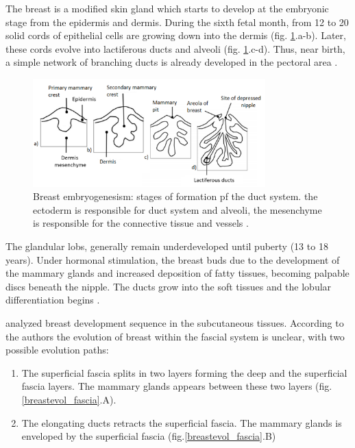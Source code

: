 The breast is a modified skin gland which starts to develop at the embryonic stage from the epidermis and dermis.  During the sixth fetal month, from 12 to 20 solid cords of epithelial cells are growing down into the dermis (fig. \ref{breastembryogenesis}.a-b). Later, these cords evolve into lactiferous ducts and alveoli (fig. \ref{breastembryogenesis}.c-d). Thus, near birth, a simple network of branching ducts is already developed in the pectoral area \citep{skandalakis_embryology_2009}.
 

 \begin{figure}[!h]
 \centering
\includegraphics[width=0.8\textwidth,keepaspectratio]{figures/breast_evolution_my.png} 
\caption[Breast embryogenesis: embryonic evolution of duct system. The epidermis is responsible for the creation of ductal system and alveoli, the dermis mesenchyme is responsible for the creation of connective tissue and vessels] {Breast embryogenesism: stages of formation pf the duct system. the ectoderm is responsible for duct system and alveoli, the mesenchyme is responsible for the connective tissue and vessels \citep{skandalakis_embryology_2009}.}
\label{breastembryogenesis}
\end{figure}


The glandular lobs, generally remain underdeveloped until puberty (13 to 18 years). Under hormonal stimulation, the breast buds due to the development of the mammary glands and increased deposition of fatty tissues, becoming palpable discs beneath the nipple. The ducts grow into the soft tissues and the lobular differentiation begins \citep{kopans2007breast}. 

\cite{kopans2007breast} analyzed breast development sequence in the subcutaneous tissues. According to the authors the evolution of breast within the fascial system is unclear, with two possible evolution paths: 
\begin{enumerate}[label=(\Alph*)]
\item The superficial fascia splits in two layers forming the deep and the superficial fascia layers. The mammary glands appears between these two layers (fig.\ref{breastevol_fascia}.A).
\item The elongating ducts retracts the superficial fascia.  The mammary glands is enveloped by the superficial fascia (fig.\ref{breastevol_fascia}.B)
\end{enumerate}

